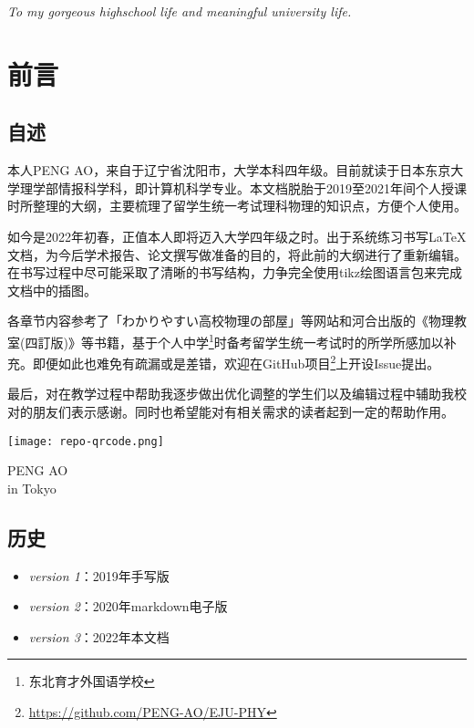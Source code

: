 
\clearpage
\begin{center}
    \null

    \vspace{0.382\textheight}
    \textit{\large
        To my gorgeous highschool life
        and meaningful university life.
    }
\end{center}


\clearpage
\chapter{前言}

\section*{自述}
本人PENG AO，来自于辽宁省沈阳市，大学本科四年级。目前就读于日本东京大学理学部情报科学科，即计算机科学专业。本文档脱胎于2019至2021年间个人授课时所整理的大纲，主要梳理了留学生统一考试理科物理的知识点，方便个人使用。

如今是2022年初春，正值本人即将迈入大学四年级之时。出于系统练习书写\LaTeX 文档，为今后学术报告、论文撰写做准备的目的，将此前的大纲进行了重新编辑。在书写过程中尽可能采取了清晰的书写结构，力争完全使用tikz绘图语言包来完成文档中的插图。

各章节内容参考了「わかりやすい高校物理の部屋」等网站和河合出版的《物理教室(四訂版)》等书籍，基于个人中学\footnote{东北育才外国语学校}时备考留学生统一考试时的所学所感加以补充。即便如此也难免有疏漏或是差错，欢迎在GitHub项目\footnote{\url{https://github.com/PENG-AO/EJU-PHY}}上开设Issue提出。

最后，对在教学过程中帮助我逐步做出优化调整的学生们以及编辑过程中辅助我校对的朋友们表示感谢。同时也希望能对有相关需求的读者起到一定的帮助作用。

\begin{center}
    \texttt{[image: repo-qrcode.png]}
\end{center}

\begin{flushright}
    PENG AO\\
     in Tokyo
\end{flushright}

\section*{历史}
\begin{itemize}
    \item \textit{version 1}：2019年手写版
    \item \textit{version 2}：2020年markdown电子版
    \item \textit{version 3}：2022年本文档
\end{itemize}

